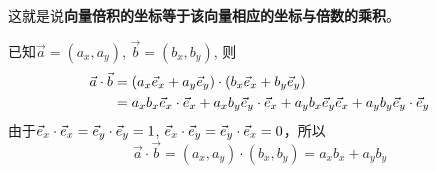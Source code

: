 这就是说\textbf{向量倍积的坐标等于该向量相应的坐标与倍数的乘积}。

已知$\vec{a}=(a_x,a_y)$, $\vec{b}=(b_x,b_y)$, 则
\[\begin{split}
    \vec{a}\cdot \vec{b}&=(a_x\vec{e}_x+a_y\vec{e}_y)\cdot (b_x\vec{e}_x+b_y\vec{e}_y)\\
    &=a_xb_x\vec{e}_x\cdot \vec{e}_x+a_xb_y\vec{e}_y\cdot \vec{e}_x+a_yb_x\vec{e}_y\vec{e}_x+a_yb_y\vec{e}_y\cdot \vec{e}_y
\end{split}\]
由于$\vec{e}_x\cdot \vec{e}_x=\vec{e}_y\cdot \vec{e}_y=1$, $\vec{e}_x\cdot \vec{e}_y=\vec{e}_y\cdot \vec{e}_x=0$，所以
\[\vec{a}\cdot \vec{b}=(a_x,a_y)\cdot (b_x,b_y)=a_xb_x+a_yb_y\]
































































































